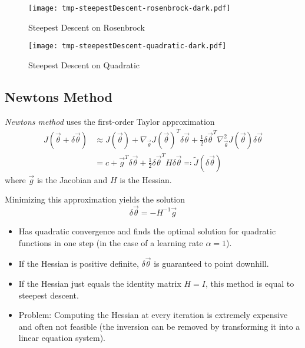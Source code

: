 				\begin{figure}
					\centering
					\texttt{[image: tmp-steepestDescent-rosenbrock-dark.pdf]}
					\caption{Steepest Descent on Rosenbrock}
					\label{fig:steepestDescentExampleRosenbrock}
				\end{figure}
				\begin{figure}
					\centering
					\texttt{[image: tmp-steepestDescent-quadratic-dark.pdf]}
					\caption{Steepest Descent on Quadratic}
					\label{fig:steepestDescentExampleQuadratic}
				\end{figure}

		\subsection{Newtons Method}
			\emph{Newtons method} uses the first-order Taylor approximation
			\begin{align}
				J(\vec{\theta} + \delta\vec{\theta}) &\approx J(\vec{\theta}) + \nabla_{\vec{\theta}} J(\vec{\theta})^T \delta\vec{\theta} + \frac{1}{2} \delta\vec{\theta}^T \nabla_{\vec{\theta}}^2 J(\vec{\theta}) \delta\vec{\theta} \\
					&= c + \vec{g}^T \delta\vec{\theta} + \frac{1}{2} \delta\vec{\theta}^T H \delta\vec{\theta} \eqqcolon \tilde{J}(\delta\vec{\theta})
			\end{align}
			where \(\vec{g}\) is the Jacobian and \(H\) is the Hessian.

			Minimizing this approximation yields the solution
			\begin{equation}
				\delta\vec{\theta} = -H^{-1} \vec{g}
			\end{equation}

			\begin{itemize}
				\item Has quadratic convergence and finds the optimal solution for quadratic functions in one step (in the case of a learning rate \(\alpha = 1\)).
				\item If the Hessian is positive definite, \(\delta\vec{\theta}\) is guaranteed to point downhill.
				\item If the Hessian just equals the identity matrix \( H = I \), this method is equal to steepest descent.
				\item Problem: Computing the Hessian at every iteration is extremely expensive and often not feasible (the inversion can be removed by transforming it into a linear equation system).
			\end{itemize}

